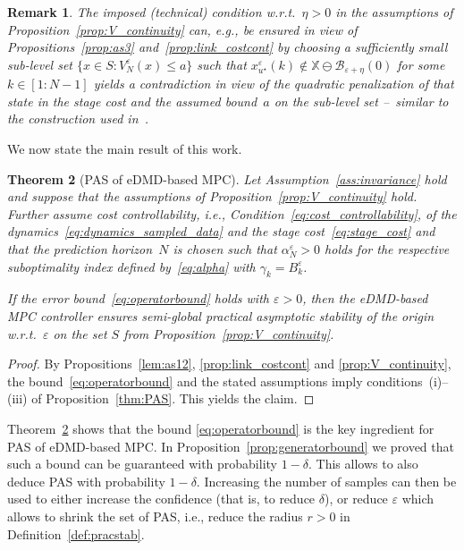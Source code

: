 \documentclass{article}
\numberwithin{equation}{section}
\newtheorem{theorem}{Theorem}
\newtheorem{remark}[theorem]{Remark}
\newcommand{\bX}{\mathbb X}
\begin{document}
	\begin{remark}
		The imposed (technical) condition w.r.t.\ $\eta > 0$ in the assumptions of Proposition~\ref{prop:V_continuity} can, e.g., be ensured in view of Propositions~\ref{prop:as3} and~\ref{prop:link_costcont} by choosing a sufficiently small sub-level set $\{ x \in S : V_N^\varepsilon(x) \leq a\}$ such that $x_{u^\star}^\varepsilon(k) \notin \bX \ominus \mathcal{B}_{\varepsilon + \eta}(0)$ for some $k \in [1:N-1]$ yields a contradiction in view of the quadratic penalization of that state in the stage cost and the assumed bound~$a$ on the sub-level set --~similar to the construction used in~\cite{BoccGrun14}.
	\end{remark}
	
	\noindent We now state the main result of this work.
	\begin{theorem}[PAS of eDMD-based MPC]\label{thm:main}
		Let Assumption~\ref{ass:invariance} hold and suppose that the assumptions of Proposition~\ref{prop:V_continuity} hold.
		Further assume cost controllability, i.e., Condition~\eqref{eq:cost_controllability}, of the dynamics~\eqref{eq:dynamics_sampled_data} and the stage cost~\eqref{eq:stage_cost} and that the prediction horizon~$N$ is chosen such that $\alpha_N^\varepsilon > 0$ holds for the respective suboptimality index defined by~\eqref{eq:alpha} with $\gamma_k = B_k^\varepsilon$. 
		
		If the error bound~\eqref{eq:operatorbound} holds with $\varepsilon > 0$, then the eDMD-based MPC controller ensures semi-global practical asymptotic stability of the origin w.r.t.\ $\varepsilon$ on the set $S$ from Proposition~\ref{prop:V_continuity}.
	\end{theorem}
	\begin{proof}
		By Propositions~\ref{lem:as12}, %
		\ref{prop:link_costcont}
		and \ref{prop:V_continuity}, the bound~\eqref{eq:operatorbound} and the stated assumptions imply conditions~(i)--(iii) of Proposition~\ref{thm:PAS}. This yields the claim.
	\end{proof}
	\noindent Theorem~\ref{thm:main} shows that the bound \eqref{eq:operatorbound} is the key ingredient for PAS of eDMD-based MPC. In Proposition~\ref{prop:generatorbound} we proved that such a bound can be guaranteed with probability $1-\delta$. This allows to also deduce PAS with probability $1-\delta$. Increasing the number of samples can then be used to either increase the confidence (that is, to reduce $\delta$), or reduce $\varepsilon$ which allows to shrink the set of PAS, i.e., reduce the radius $r>0$ in Definition~\ref{def:pracstab}.
	
\end{document}
